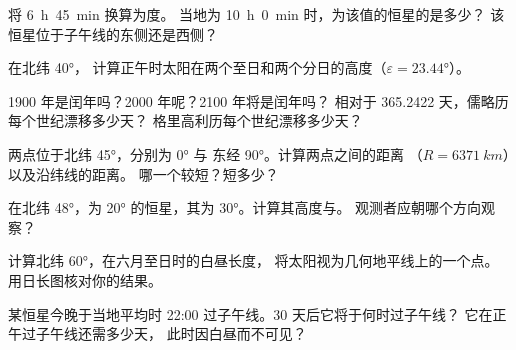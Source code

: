 \begin{exercise}[$\star$]\label{exo:b1:spherical-astronomy:2}
将 \qty{6}{h}~\qty{45}{min} 换算为度。
当地为 \qty{10}{h}~\qty{0}{min} 时，为该值的恒星的是多少？
该恒星位于子午线的东侧还是西侧？
\end{exercise}

\begin{exercise}[$\star$]\label{exo:b1:spherical-astronomy:3}
在北纬 \ang{40}，
计算正午时太阳在两个至日和两个分日的高度（$\varepsilon = \ang{23.44}$）。
\end{exercise}

\begin{exercise}[$\star$]\label{exo:b1:spherical-astronomy:4}
1900 年是闰年吗？2000 年呢？2100 年将是闰年吗？
相对于 365.2422 天，儒略历每个世纪漂移多少天？
格里高利历每个世纪漂移多少天？
\end{exercise}

\begin{exercise}[$\star\star$]\label{exo:b1:spherical-astronomy:5}
两点位于北纬 \ang{45}，分别为 \ang{0} 与
东经 \ang{90}。计算两点之间的距离
（$R = \qty{6371}{km}$）以及沿纬线的距离。
哪一个较短？短多少？
\end{exercise}

\begin{exercise}[$\star\star$]\label{exo:b1:spherical-astronomy:6}
在北纬 \ang{48}，为 \ang{20} 的恒星，其为
\ang{30}。计算其高度与。
观测者应朝哪个方向观察？
\end{exercise}

\begin{exercise}[$\star\star$]\label{exo:b1:spherical-astronomy:7}
计算北纬 \ang{60}，在六月至日时的白昼长度，
将太阳视为几何地平线上的一个点。
用日长图核对你的结果。
\end{exercise}

\begin{exercise}[$\star\star$]\label{exo:b1:spherical-astronomy:8}
某恒星今晚于当地平均时 22:00 过子午线。30 天后它将于何时过子午线？
它在正午过子午线还需多少天，
此时因白昼而不可见？
\end{exercise}

